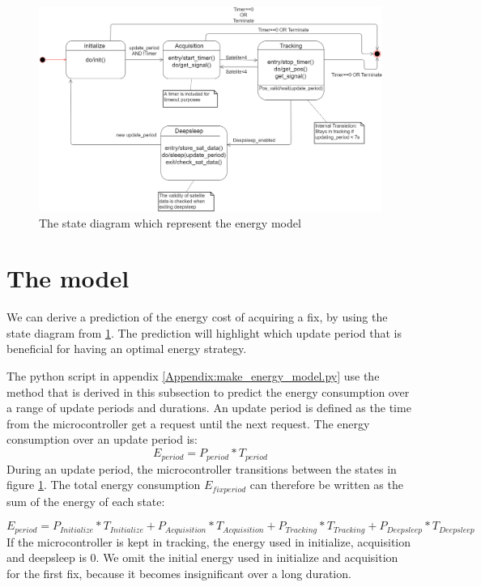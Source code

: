 \begin{figure}[h]
\centering
\includegraphics[width=15 cm]{Project_Report/Images/Energymodel.png}
\caption{The state diagram which represent the energy model}
\label{fig:GPS energymodel}
\end{figure}

\section{The model}
We can derive a prediction of the energy cost of acquiring a fix, by using the state diagram from \ref{fig:GPS energymodel}. The prediction will highlight which update period that is beneficial for having an optimal energy strategy. 
 
The python script in appendix \ref{Appendix:make_energy_model.py} use the method that is derived in this subsection to predict the energy consumption over a range of update periods and durations. An update period is defined as the time from the microcontroller get a request until the next request. The energy consumption over an update period is:
\begin{equation}
E_{period} = P_{period}*T_{period}
\end{equation}
During an update period, the microcontroller transitions between the states in figure \ref{fig:GPS energymodel}. The total energy consumption $E_{fixperiod}$ can therefore be written as the sum of the energy of each state:

\begin{equation}
E_{period} = P_{Initialize}*T_{Initialize} + P_{Acquisition}*T_{Acquisition} + P_{Tracking}*T_{Tracking} + P_{Deepsleep}*T_{Deepsleep}
\end{equation}
If the microcontroller is kept in tracking, the energy used in initialize, acquisition and deepsleep is 0. We omit the initial energy used in initialize and acquisition for the first fix, because it becomes insignificant over a long duration.  

